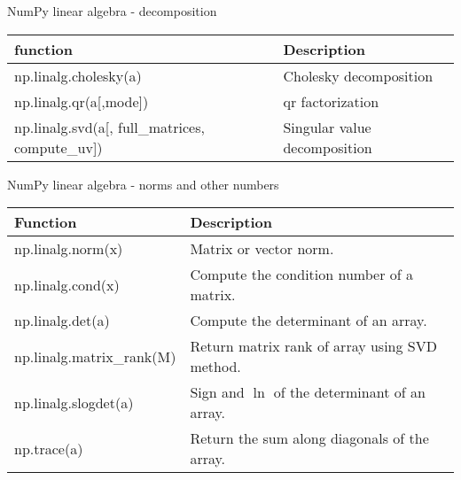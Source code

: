 \documentclass[10pt]{beamer}
\begin{document}

\begin{frame}[fragile]{NumPy linear algebra - decomposition}
\begin{table}
\begin{tabular}{ll}
\textbf{function} & \textbf{Description}  \\
\hline
np.linalg.cholesky(a) & Cholesky decomposition \\
np.linalg.qr(a[,mode]) & qr factorization \\
np.linalg.svd(a[, full\_matrices, compute\_uv]) & Singular value decomposition \\
\end{tabular}
\end{table}
\end{frame}


\begin{frame}{NumPy linear algebra - norms and other numbers}
\begin{table}
\begin{tabular}{ll}
\textbf{Function} & \textbf{Description}  \\
\hline
np.linalg.norm(x) 	     & Matrix or vector norm.\\
np.linalg.cond(x) 	     & Compute the condition number of a matrix.\\
np.linalg.det(a) 	       & Compute the determinant of an array.\\
np.linalg.matrix\_rank(M) & Return matrix rank of array using SVD method.\\
np.linalg.slogdet(a) 	   & Sign and $\ln$ of the determinant of an array.\\
np.trace(a) 	           & Return the sum along diagonals of the array.\\
\end{tabular}
\end{table}
\end{frame}
\end{document}

